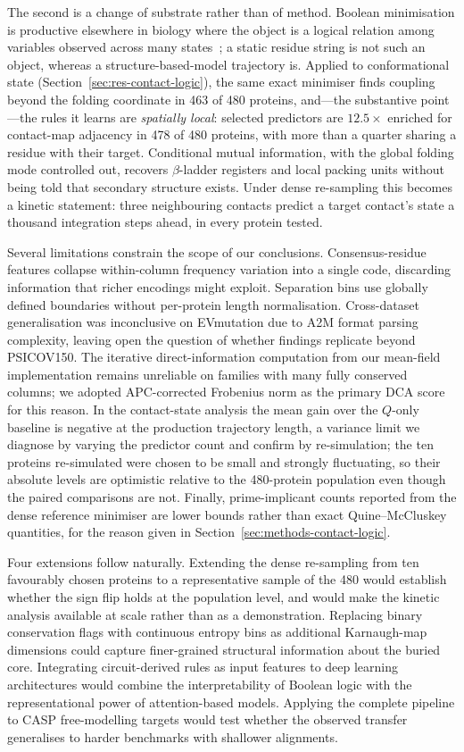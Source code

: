 The second is a change of substrate rather than of method.  Boolean
minimisation is productive elsewhere in biology where the object is a logical
relation among variables observed across many states~\cite{kocevar2024sailor};
a static residue string is not such an object, whereas a structure-based-model
trajectory is.  Applied to conformational state
(Section~\ref{sec:res-contact-logic}), the same exact minimiser finds coupling
beyond the folding coordinate in 463 of 480 proteins, and---the substantive
point---the rules it learns are \emph{spatially local}: selected predictors are
$12.5\times$ enriched for contact-map adjacency in 478 of 480 proteins, with
more than a quarter sharing a residue with their target.  Conditional mutual
information, with the global folding mode controlled out, recovers
$\beta$-ladder registers and local packing units without being told that
secondary structure exists.  Under dense re-sampling this becomes a kinetic
statement: three neighbouring contacts predict a target contact's state a
thousand integration steps ahead, in every protein tested.

Several limitations constrain the scope of our conclusions.  Consensus-residue
features collapse within-column frequency variation into a single code,
discarding information that richer encodings might exploit.  Separation bins
use globally defined boundaries without per-protein length normalisation.
Cross-dataset generalisation was inconclusive on EVmutation due to A2M format
parsing complexity, leaving open the question of whether findings replicate
beyond PSICOV150.  The iterative direct-information computation from our
mean-field implementation remains unreliable on families with many fully
conserved columns; we adopted APC-corrected Frobenius norm as the primary DCA
score for this reason.  In the contact-state analysis the mean gain over the
$Q$-only baseline is negative at the production trajectory length, a
variance limit we diagnose by varying the predictor count and confirm by
re-simulation; the ten proteins re-simulated were chosen to be small and
strongly fluctuating, so their absolute levels are optimistic relative to the
480-protein population even though the paired comparisons are not.  Finally,
prime-implicant counts reported from the dense reference minimiser are lower
bounds rather than exact Quine--McCluskey quantities, for the reason given in
Section~\ref{sec:methods-contact-logic}.

Four extensions follow naturally.  Extending the dense re-sampling from ten
favourably chosen proteins to a representative sample of the 480 would
establish whether the sign flip holds at the population level, and would make
the kinetic analysis available at scale rather than as a demonstration.  Replacing binary conservation flags with
continuous entropy bins as additional Karnaugh-map dimensions could capture
finer-grained structural information about the buried core.  Integrating
circuit-derived rules as input features to deep learning architectures would
combine the interpretability of Boolean logic with the representational power
of attention-based models.  Applying the complete pipeline to CASP
free-modelling targets would test whether the observed transfer generalises
to harder benchmarks with shallower alignments.
